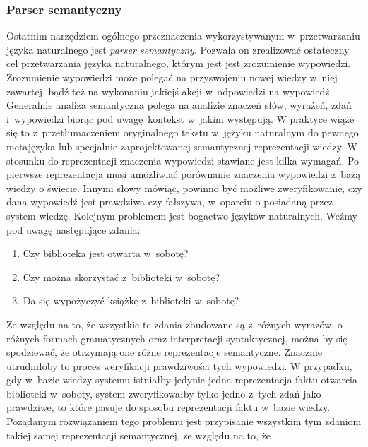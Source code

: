 \documentclass[a4paper, twoside, openright, 12pt]{report}
\begin{document}
            \subsubsection{Parser semantyczny}
                Ostatnim narzędziem ogólnego przeznaczenia wykorzystywanym w~przetwarzaniu języka naturalnego jest
                \emph{parser semantyczny}. Pozwala on zrealizować ostateczny cel przetwarzania języka naturalnego, którym
                jest jest zrozumienie wypowiedzi. Zrozumienie wypowiedzi może polegać na przyswojeniu nowej wiedzy w~niej
                zawartej, bądź też na wykonaniu jakiejś akcji w~odpowiedzi na wypowiedź. Generalnie analiza semantyczna
                polega na analizie znaczeń słów, wyrażeń, zdań i~wypowiedzi biorąc pod uwagę kontekst w~jakim występują.
                W praktyce wiąże się to z~przetłumaczeniem oryginalnego tekstu w~języku naturalnym do pewnego metajęzyka
                lub specjalnie zaprojektowanej semantycznej reprezentacji wiedzy. W stosunku do reprezentacji znaczenia
                wypowiedzi stawiane jest kilka wymagań. Po pierwsze reprezentacja musi umożliwiać porównanie znaczenia wypowiedzi
                z~bazą wiedzy o świecie. Innymi słowy mówiąc, powinno być możliwe zweryfikowanie, czy dana wypowiedź jest
                prawdziwa czy fałszywa, w~oparciu o posiadaną przez system wiedzę. Kolejnym problemem jest bogactwo języków
                naturalnych. Weźmy pod uwagę następujące zdania:
                \begin{enumerate}
                    \item Czy biblioteka jest otwarta w~sobotę?
                    \item Czy można skorzystać z~biblioteki w~sobotę?
                    \item Da się wypożyczyć książkę z~biblioteki w~sobotę?
                \end{enumerate}
                Ze względu na to, że wszystkie te zdania zbudowane są z~różnych wyrazów, o różnych formach gramatycznych oraz
                interpretacji syntaktycznej, można by się spodziewać, że otrzymają one różne reprezentacje semantyczne. Znacznie
                utrudniłoby to proces weryfikacji prawdziwości tych wypowiedzi. W przypadku, gdy w~bazie wiedzy systemu istniałby
                jedynie jedna reprezentacja faktu otwarcia biblioteki w~soboty, system zweryfikowałby tylko jedno z~tych zdań
                jako prawdziwe, to które pasuje do sposobu reprezentacji faktu w~bazie wiedzy. Pożądanym rozwiązaniem tego
                problemu jest przypisanie wszystkim tym zdaniom takiej samej reprezentacji semantycznej, ze względu na to, że
\end{document}
